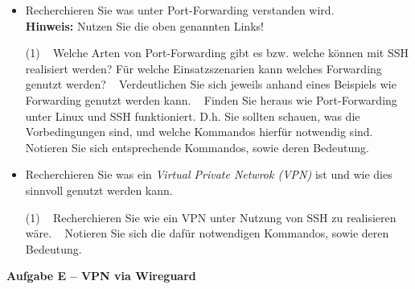 \documentclass[paper=a4,fontsize=11pt]{scrartcl}%
\numberwithin{equation}{section}
\begin{document}
\begin{itemize}
	\item Recherchieren Sie was unter Port-Forwarding verstanden wird.\\
	\textbf{Hinweis:} Nutzen Sie die oben genannten Links!
	\begin{tasks}(1)
		\task~ Welche Arten von Port-Forwarding gibt es bzw. welche können mit SSH realisiert werden? Für welche Einsatzszenarien kann welches Forwarding genutzt werden?
		\task~ Verdeutlichen Sie sich jeweils anhand eines Beispiels wie Forwarding genutzt werden kann.
		\task~ Finden Sie heraus wie Port-Forwarding unter Linux und SSH funktioniert. D.h. Sie sollten schauen, was die Vorbedingungen sind, und welche Kommandos hierfür notwendig sind. Notieren Sie sich entsprechende Kommandos, sowie deren Bedeutung.
	\end{tasks}
	\item Recherchieren Sie was ein \emph{Virtual Private Netwrok (VPN)} ist und wie dies sinnvoll genutzt werden kann.
	\begin{tasks}(1)
		\task~ Recherchieren Sie wie ein VPN unter Nutzung von SSH zu realisieren wäre.
		\task~ Notieren Sie sich die dafür notwendigen Kommandos, sowie deren Bedeutung.
	\end{tasks}
\end{itemize}
\begin{center}\Large{\textbf{Aufgabe E -- VPN via Wireguard}}\end{center}\vskip0.25in
\end{document}
